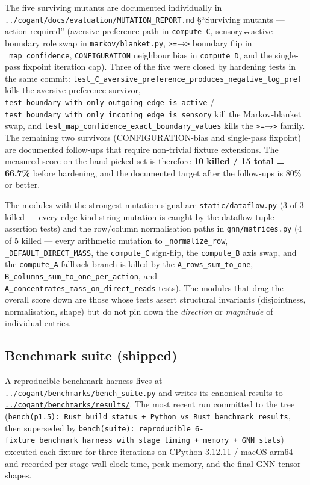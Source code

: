 \documentclass[
]{article}
\begin{document}
The five surviving mutants are documented individually in
\texttt{../cogant/docs/evaluation/MUTATION\_REPORT.md} §``Surviving
mutants --- action required'' (aversive preference path in
\texttt{compute\_C}, sensory↔active boundary role swap in
\texttt{markov/blanket.py},
\texttt{\textgreater{}=}→\texttt{\textgreater{}} boundary flip in
\texttt{\_map\_confidence}, \texttt{CONFIGURATION} neighbour bias in
\texttt{compute\_D}, and the single-pass fixpoint iteration cap). Three
of the five were closed by hardening tests in the same commit:
\texttt{test\_C\_aversive\_preference\_produces\_negative\_log\_pref}
kills the aversive-preference survivor,
\texttt{test\_boundary\_with\_only\_outgoing\_edge\_is\_active} /
\texttt{test\_boundary\_with\_only\_incoming\_edge\_is\_sensory} kill
the Markov-blanket swap, and
\texttt{test\_map\_confidence\_exact\_boundary\_values} kills the
\texttt{\textgreater{}=}→\texttt{\textgreater{}} family. The remaining
two survivors (CONFIGURATION-bias and single-pass fixpoint) are
documented follow-ups that require non-trivial fixture extensions. The
measured score on the hand-picked set is therefore \textbf{10 killed /
15 total = 66.7\%} before hardening, and the documented target after the
follow-ups is 80\% or better.

The modules with the strongest mutation signal are
\texttt{static/dataflow.py} (3 of 3 killed --- every edge-kind string
mutation is caught by the dataflow-tuple-assertion tests) and the
row/column normalisation paths in \texttt{gnn/matrices.py} (4 of 5
killed --- every arithmetic mutation to \texttt{\_normalize\_row},
\texttt{\_DEFAULT\_DIRECT\_MASS}, the \texttt{compute\_C} sign-flip, the
\texttt{compute\_B} axis swap, and the \texttt{compute\_A} fallback
branch is killed by the \texttt{A\_rows\_sum\_to\_one},
\texttt{B\_columns\_sum\_to\_one\_per\_action}, and
\texttt{A\_concentrates\_mass\_on\_direct\_reads} tests). The modules
that drag the overall score down are those whose tests assert structural
invariants (disjointness, normalisation, shape) but do not pin down the
\emph{direction} or \emph{magnitude} of individual entries.

\subsection{Benchmark suite (shipped)}\label{benchmark-suite-shipped-1}

A reproducible benchmark harness lives at
\href{../cogant/benchmarks/bench_suite.py}{\texttt{../cogant/benchmarks/bench\_suite.py}}
and writes its canonical results to
\href{../cogant/benchmarks/results/}{\texttt{../cogant/benchmarks/results/}}.
The most recent run committed to the tree
(\texttt{bench(p1.5):\ Rust\ build\ status\ +\ Python\ vs\ Rust\ benchmark\ results},
then superseded by
\texttt{bench(suite):\ reproducible\ 6-fixture\ benchmark\ harness\ with\ stage\ timing\ +\ memory\ +\ GNN\ stats})
executed each fixture for three iterations on CPython 3.12.11 / macOS
arm64 and recorded per-stage wall-clock time, peak memory, and the final
GNN tensor shapes.
\end{document}

